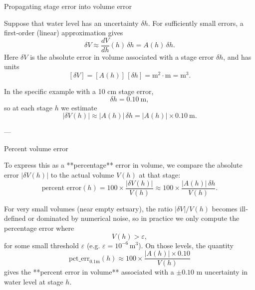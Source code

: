 \documentclass[preprint,12pt,authoryear]{elsarticle}
\begin{document}
 Propagating stage error into volume error

Suppose that water level has an uncertainty \(\delta h\). For sufficiently small
errors, a first‐order (linear) approximation gives
\[
\delta V \approx \frac{dV}{dh}(h)\,\delta h = A(h)\,\delta h.
\]
Here \(\delta V\) is the absolute error in volume associated with a stage error
\(\delta h\), and has units
\[
[\delta V] = [A(h)]\,[\delta h]
           = \text{m}^2 \cdot \text{m}
           = \text{m}^3.
\]

In the specific example with a 10 cm stage error,
\[
\delta h = 0.10~\text{m},
\]
so at each stage \(h\) we estimate
\[
|\delta V(h)| \approx |A(h)| \,\delta h
                  = |A(h)| \times 0.10~\text{m}.
\]

---

 Percent volume error

To express this as a **percentage** error in volume, we compare the absolute
error \(|\delta V(h)|\) to the actual volume \(V(h)\) at that stage:
\[
\text{percent error}(h)
= 100 \times \frac{|\delta V(h)|}{V(h)}
\approx 100 \times \frac{|A(h)|\,\delta h}{V(h)}.
\]

For very small volumes (near empty estuary), the ratio
\(|\delta V| / V(h)\) becomes ill‐defined or dominated by numerical noise,
so in practice we only compute the percentage error where
\[
V(h) > \varepsilon,
\]
for some small threshold \(\varepsilon\) (e.g. \(\varepsilon = 10^{-6}\,\text{m}^3\)).
On those levels, the quantity
\[
\text{pct\_err}_{0.1\text{m}}(h)
\approx 100 \times \frac{|A(h)| \times 0.10}{V(h)}
\]
gives the **percent error in volume** associated with a \(\pm 0.10\) m uncertainty
in water level at stage \(h\).

  
 
\end{document}
